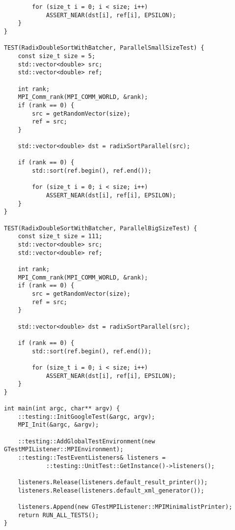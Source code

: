 \documentclass{report}
\begin{document}
\begin{lstlisting}
        for (size_t i = 0; i < size; i++)
            ASSERT_NEAR(dst[i], ref[i], EPSILON);
    }
}

TEST(RadixDoubleSortWithBatcher, ParallelSmallSizeTest) {
    const size_t size = 5;
    std::vector<double> src;
    std::vector<double> ref;

    int rank;
    MPI_Comm_rank(MPI_COMM_WORLD, &rank);
    if (rank == 0) {
        src = getRandomVector(size);
        ref = src;
    }

    std::vector<double> dst = radixSortParallel(src);

    if (rank == 0) {
        std::sort(ref.begin(), ref.end());

        for (size_t i = 0; i < size; i++)
            ASSERT_NEAR(dst[i], ref[i], EPSILON);
    }
}

TEST(RadixDoubleSortWithBatcher, ParallelBigSizeTest) {
    const size_t size = 111;
    std::vector<double> src;
    std::vector<double> ref;

    int rank;
    MPI_Comm_rank(MPI_COMM_WORLD, &rank);
    if (rank == 0) {
        src = getRandomVector(size);
        ref = src;
    }

    std::vector<double> dst = radixSortParallel(src);

    if (rank == 0) {
        std::sort(ref.begin(), ref.end());

        for (size_t i = 0; i < size; i++)
            ASSERT_NEAR(dst[i], ref[i], EPSILON);
    }
}

int main(int argc, char** argv) {
    ::testing::InitGoogleTest(&argc, argv);
    MPI_Init(&argc, &argv);

    ::testing::AddGlobalTestEnvironment(new GTestMPIListener::MPIEnvironment);
    ::testing::TestEventListeners& listeners =
            ::testing::UnitTest::GetInstance()->listeners();

    listeners.Release(listeners.default_result_printer());
    listeners.Release(listeners.default_xml_generator());

    listeners.Append(new GTestMPIListener::MPIMinimalistPrinter);
    return RUN_ALL_TESTS();
}
\end{lstlisting}
\end{document}
